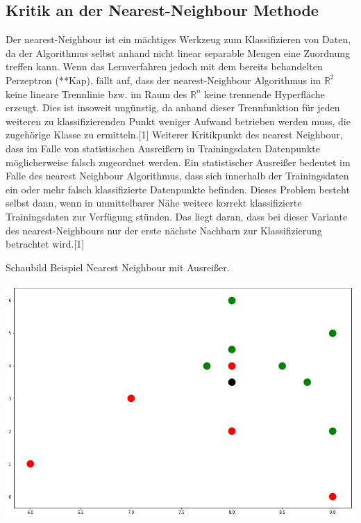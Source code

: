 \documentclass[a4paper]{scrartcl}
\begin{document}
\begin{multicols}{2}
            \subsection{Kritik an der Nearest-Neighbour Methode}
                Der nearest-Neighbour ist ein mächtiges Werkzeug zum Klassifizieren von Daten, da der Algorithmus selbst anhand nicht linear separable Mengen eine Zuordnung treffen kann. Wenn das Lernverfahren jedoch mit dem bereits behandelten Perzeptron (**Kap), fällt auf, dass der nearest-Neighbour Algorithmus im $\mathbb{R}^2$ keine lineare Trennlinie bzw. im Raum des $\mathbb{R}^n$ keine trennende Hyperfläche erzeugt. Dies ist insoweit ungünstig, da anhand dieser Trennfunktion für jeden weiteren zu klassifizierenden Punkt weniger Aufwand betrieben werden muss, die zugehörige Klasse zu ermitteln.[1] 
                Weiterer Kritikpunkt des nearest Neighbour, dass im Falle von statistischen Ausreißern in Trainingsdaten Datenpunkte möglicherweise falsch zugeordnet werden. Ein statistischer Ausreißer bedeutet im Falle des nearest Neighbour Algorithmus, dass sich innerhalb der Trainingsdaten ein oder mehr falsch klassifizierte Datenpunkte befinden. Dieses Problem besteht selbst dann, wenn in unmittelbarer Nähe weitere korrekt klassifizierte Trainingsdaten zur Verfügung stünden. Das liegt daran, dass bei dieser Variante des nearest-Neighbours nur der erste nächste Nachbarn zur Klassifizierung betrachtet wird.[1]
                         
                Schaubild Beispiel Nearest Neighbour mit Ausreißer.
                            
                \includegraphics[width=\linewidth]{errnn1.png}
                            

\end{multicols}
\end{document}
